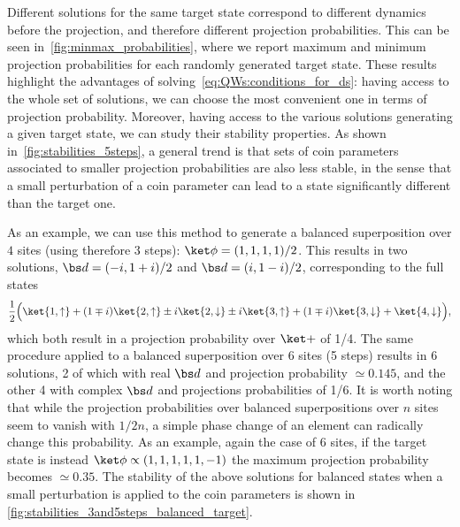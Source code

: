 Different solutions for the same target state correspond to different dynamics before the projection, and therefore different projection probabilities.
This can be seen in~\cref{fig:minmax_probabilities}, where we report maximum and minimum projection probabilities for each randomly generated target state.
These results highlight the advantages of solving~\cref{eq:QWs:conditions_for_ds}: having access to the whole set of solutions, we can choose the most convenient one in terms of projection probability.
Moreover, having access to the various solutions generating a given target state, we can study their stability properties.
As shown in~\cref{fig:stabilities_5steps}, a general trend is that sets of coin parameters associated to smaller projection probabilities are also less stable, in the sense that a small perturbation of a coin parameter can lead to a state significantly different than the target one.

As an example, we can use this method to generate a balanced superposition over $4$ sites (using therefore $3$ steps): $\ket\phi = (1, 1, 1, 1) / 2$.
This results in two solutions, $\bs d = (-i, 1+i)/2$ and $\bs d = (i, 1 - i)/2$,
corresponding to the full states
\begin{equation}
	\frac{1}{2}\Big(
		\ket{1,\uparrow} + 
		(1 \mp i) \ket{2,\uparrow} \pm i \ket{2, \downarrow}
		\pm i \ket{3, \uparrow} + (1 \mp i) \ket{3, \downarrow} +
		\ket{4, \downarrow}
	\Big),
\end{equation}
which both result in a projection probability over $\ket+$ of 1/4.
The same procedure applied to a balanced superposition over 6 sites (5 steps) results in 6 solutions, 2 of which with real $\bs d$ and projection probability $\simeq 0.145$, and the other 4 with complex $\bs d$ and projections probabilities of 1/6.
It is worth noting that while the projection probabilities over balanced superpositions over $n$ sites seem to vanish with $1/2n$, a simple phase change of an element can radically change this probability.
As an example, again the case of 6 sites, if the target state is instead $\ket\phi \propto (1,1,1,1,1,-1)$ the maximum projection probability becomes $\simeq 0.35$.
The stability of the above solutions for balanced states when a small perturbation is applied to the coin parameters is shown in \cref{fig:stabilities_3and5steps_balanced_target}.


